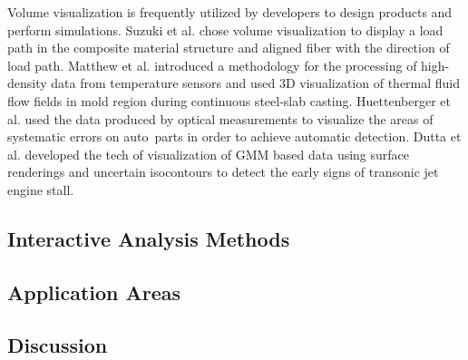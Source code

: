 \documentclass[a4paper,fleqn]{cas-dc}
\begin{document}
Volume visualization is frequently utilized by developers to design products and perform simulations.
Suzuki et al. \cite{Suzuki2020} chose volume visualization to display a load path in the composite material structure and aligned fiber with the direction of load path.
Matthew et al. \cite{Zappulla2019} introduced a methodology for the processing of high-density data from temperature sensors and used 3D visualization of thermal fluid flow fields in mold region during continuous steel-slab casting.
Huettenberger et al. \cite{Huettenberger2015} used the data produced by optical measurements to visualize the areas of systematic errors on auto parts in order to achieve automatic detection.
Dutta et al. \cite{dutta2016situ} developed the tech of visualization of GMM based data using surface renderings and uncertain isocontours to detect the early signs of transonic jet engine stall.
\subsection{Interactive Analysis Methods}

\subsection{Application Areas}

\subsection{Discussion}

\end{document}
